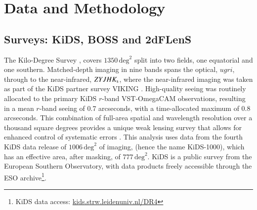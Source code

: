 \section{Data and Methodology}
\label{sec:data}

\subsection{Surveys:  KiDS, BOSS and 2dFLenS}
\label{sec:surveys}

The Kilo-Degree Survey \citep[KiDS,][]{dejong/etal:2013}, covers $1350\,\mathrm{deg}^{2}$ split into two fields, one
equatorial and one southern.    Matched-depth imaging in nine bands spans the optical,
$ugri$, through to the near-infrared, $ZYJHK_{\rm s}$, where the
near-infrared imaging was taken as part of the KiDS partner survey
VIKING \citep[the VISTA Kilo-degree INfrared Galaxy
survey,][]{edge/etal:2013}.  High-quality seeing was
routinely allocated to the primary KiDS $r$-band VST-OmegaCAM observations, resulting in a
mean $r$-band seeing of 0.7 arcseconds, with a time-allocated maximum of 0.8
arcseconds.  This combination of full-area spatial and wavelength
resolution over a thousand square degrees
provides a unique weak lensing survey that allows for enhanced
control of systematic errors \citep{giblin/etal:inprep, hildebrandt/etal:inprep}.
This analysis uses data from the fourth KiDS
data release of $1006\,\mathrm{deg}^{2}$ of imaging, (hence the name KiDS-1000), which has an effective
area, after masking, of $777\,\mathrm{deg}^{2}$.  KiDS is a public survey from the European Southern
Observatory, with data products freely accessible through the ESO
archive\footnote{KiDS data access: \href{http://kids.strw.leidenuniv.nl/DR4}{kids.strw.leidenuniv.nl/DR4}}.   

